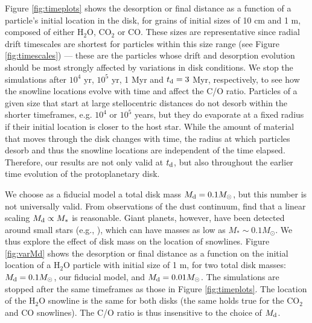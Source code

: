 \documentclass[apj]{emulateapj}
\begin{document}
Figure \ref{fig:timeplots} shows the desorption or final distance as a function of a particle's initial location in the disk, for grains of initial sizes of 10 cm and 1 m, composed of either H$_2$O, CO$_2$ or CO. These sizes are representative since radial drift timescales are shortest for particles within this size range (see Figure \ref{fig:timescales}) --- these are the particles whose drift and desorption evolution should be most strongly affected by variations in disk conditions. We stop the simulations after $10^4$ yr, $10^5$ yr, 1 Myr and $t_{\rm d}=3$ Myr, respectively, to see how the snowline locations evolve with time and affect the C/O ratio. Particles of a given size that start at large stellocentric distances do not desorb within the shorter timeframes, e.g. $10^4$ or $10^5$ years, but they do evaporate at a fixed radius if their initial location is closer to the host star. While the amount of material that moves through the disk changes with time, the radius at which particles desorb and thus the snowline locations are independent of the time elapsed. Therefore, our results are not only valid at $t_{\rm d}$, but also throughout the earlier time evolution of the protoplanetary disk. 

We choose as a fiducial model a total disk mass $M_{\rm d}=0.1 M_{\odot}$, but this number is not universally valid. From observations of the dust continuum, \citet{andrews13} find that a linear scaling $M_{\rm d} \propto M_*$ is reasonable. Giant planets, however, have been detected around small stars (e.g., \citealt{montet14}), which can have masses as low as $M_* \sim 0.1 M_{\odot}$. We thus explore the effect of disk mass on the location of snowlines. Figure \ref{fig:varMd} shows the desorption or final distance as a function on the initial location of a H$_2$O particle with initial size of 1 m, for two total disk masses: $M_{\rm d}=0.1 M_{\odot}$, our fiducial model, and $M_{\rm d}=0.01 M_{\odot}$. The simulations are stopped after the same timeframes as those in Figure \ref{fig:timeplots}. The location of the H$_2$O snowline is the same for both disks (the same holds true for the CO$_2$ and CO snowlines). The C/O ratio is thus insensitive to the choice of $M_{\rm d}$. %
\end{document}
